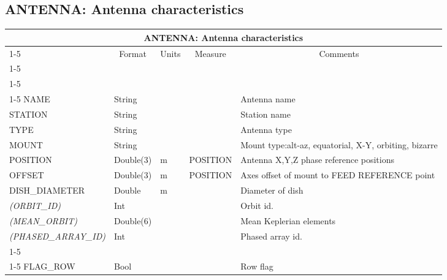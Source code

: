 \documentclass{article}
\newcommand{\defline}[1]{\cline{1-5}
\multicolumn{5}{|l|}{#1} \\
\cline{1-5}}
\newcommand{\definetable}[2]
{
	\vfill\newpage
	\subsection{#1}
        \vspace{0.15in}
        \small
	\begin{tabular}{|l|p{1.25in}|l|p{.9in}|p{1.4in}|}
	\hline
	\multicolumn{5}{|c|}{\bf #1}\\ 
	\cline{1-5}
        \multicolumn{1}{|c|}{Name}&\multicolumn{1}{|c|}{Format}&
        \multicolumn{1}{|c|}{Units}&\multicolumn{1}{|c|}{Measure}&
        \multicolumn{1}{|c|}{Comments}\\
        \cline{1-5}
        #2
        \hline
	\end{tabular}
}
\begin{document}
\definetable{ANTENNA: Antenna characteristics}
{
\defline{\bf Columns}
\defline{\em Data}
NAME &       String &  & &  Antenna name \\
STATION &        String & & &  Station name \\
TYPE  &  String &     &      & Antenna type \\
MOUNT  & String &  & &   Mount type:alt-az, equatorial, X-Y, orbiting, bizarre \\
POSITION &   Double(3) &  m   &     POSITION &   Antenna X,Y,Z phase reference positions \\
OFFSET & Double(3)  &   m &     POSITION & Axes offset of mount to FEED REFERENCE point \\
DISH\_DIAMETER &  Double &  m  &      & Diameter of dish\\
{\it (ORBIT\_ID)}    &    Int & & &  Orbit id. \\
{\it (MEAN\_ORBIT)}  &    Double(6) & & & Mean Keplerian elements\\
{\it (PHASED\_ARRAY\_ID)} & Int   &  & &   Phased array id.\\
\defline{Flag information}
FLAG\_ROW & Bool & & & Row flag\\
}
\end{document}
